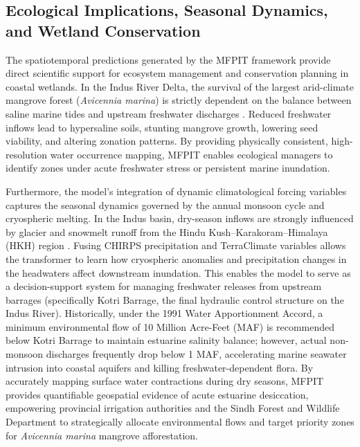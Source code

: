 \documentclass[journal]{IEEEtran}
\begin{document}
\subsection{Ecological Implications, Seasonal Dynamics, and Wetland Conservation}
The spatiotemporal predictions generated by the MFPIT framework provide direct scientific support for ecosystem management and conservation planning in coastal wetlands. In the Indus River Delta, the survival of the largest arid-climate mangrove forest (\textit{Avicennia marina}) is strictly dependent on the balance between saline marine tides and upstream freshwater discharges \cite{haider_gridded_2025, nanditha_pakistan_2023, bazai_exploring_2025}. Reduced freshwater inflows lead to hypersaline soils, stunting mangrove growth, lowering seed viability, and altering zonation patterns. By providing physically consistent, high-resolution water occurrence mapping, MFPIT enables ecological managers to identify zones under acute freshwater stress or persistent marine inundation. 

Furthermore, the model's integration of dynamic climatological forcing variables captures the seasonal dynamics governed by the annual monsoon cycle and cryospheric melting. In the Indus basin, dry-season inflows are strongly influenced by glacier and snowmelt runoff from the Hindu Kush--Karakoram--Himalaya (HKH) region \cite{immerzeel_science_2010, lutz_consistent_2014, arshad_anthropogenic_2025}. Fusing CHIRPS precipitation and TerraClimate variables allows the transformer to learn how cryospheric anomalies and precipitation changes in the headwaters affect downstream inundation. This enables the model to serve as a decision-support system for managing freshwater releases from upstream barrages (specifically Kotri Barrage, the final hydraulic control structure on the Indus River). Historically, under the 1991 Water Apportionment Accord, a minimum environmental flow of 10 Million Acre-Feet (MAF) is recommended below Kotri Barrage to maintain estuarine salinity balance; however, actual non-monsoon discharges frequently drop below 1 MAF, accelerating marine seawater intrusion into coastal aquifers and killing freshwater-dependent flora. By accurately mapping surface water contractions during dry seasons, MFPIT provides quantifiable geospatial evidence of acute estuarine desiccation, empowering provincial irrigation authorities and the Sindh Forest and Wildlife Department to strategically allocate environmental flows and target priority zones for \textit{Avicennia marina} mangrove afforestation.
\end{document}
